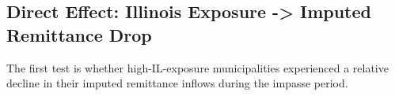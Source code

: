 \documentclass[
  11pt,
  letterpaper,
  DIV=11,
  numbers=noendperiod]{scrartcl}
\newenvironment{Shaded}{}{}
\newcommand{\FunctionTok}[1]{\textcolor[rgb]{0.44,0.26,0.76}{#1}}
\newcommand{\NormalTok}[1]{\textcolor[rgb]{0.14,0.16,0.18}{#1}}
\newcommand{\SpecialCharTok}[1]{\textcolor[rgb]{0.00,0.36,0.77}{#1}}
\newcommand{\StringTok}[1]{\textcolor[rgb]{0.01,0.18,0.38}{#1}}
\begin{document}
\begin{Shaded}
\end{Shaded}

\subsection{Direct Effect: Illinois Exposure -\textgreater{} Imputed
Remittance
Drop}\label{direct-effect-illinois-exposure---imputed-remittance-drop}

The first test is whether high-IL-exposure municipalities experienced a
relative decline in their imputed remittance inflows during the impasse
period.
\end{document}
